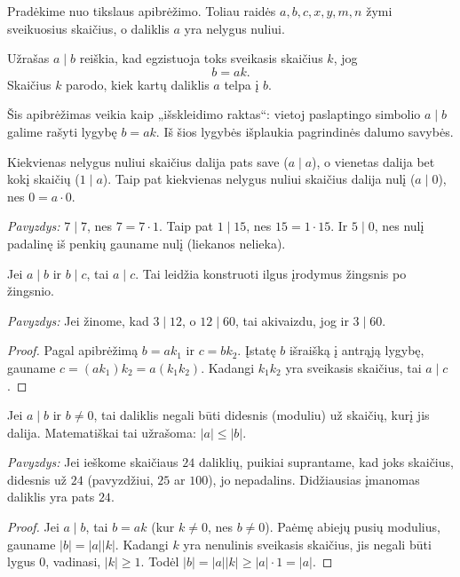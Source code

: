 \documentclass[11pt,a4paper]{scrartcl}
\begin{document}
Pradėkime nuo tikslaus apibrėžimo. Toliau raidės \(a,b,c,x,y,m,n\) žymi sveikuosius skaičius, o daliklis \(a\) yra nelygus nuliui.

\begin{definition*}
Užrašas \(a\mid b\) reiškia, kad egzistuoja toks sveikasis skaičius \(k\), jog
\begin{equation*}
    b=ak.
\end{equation*}
Skaičius \(k\) parodo, kiek kartų daliklis \(a\) telpa į \(b\).
\end{definition*}

Šis apibrėžimas veikia kaip „išskleidimo raktas“: vietoj paslaptingo simbolio \(a\mid b\) galime rašyti lygybę \(b=ak\). Iš šios lygybės išplaukia pagrindinės dalumo savybės.

\begin{proposition}
Kiekvienas nelygus nuliui skaičius dalija pats save (\(a \mid a\)), o vienetas dalija bet kokį skaičių (\(1 \mid a\)). Taip pat kiekvienas nelygus nuliui skaičius dalija nulį (\(a \mid 0\)), nes \(0 = a \cdot 0\).
\end{proposition}
\textit{Pavyzdys:} \(7 \mid 7\), nes \(7 = 7 \cdot 1\). Taip pat \(1 \mid 15\), nes \(15 = 1 \cdot 15\). Ir \(5 \mid 0\), nes nulį padalinę iš penkių gauname nulį (liekanos nelieka).

\begin{proposition}
Jei \(a \mid b\) ir \(b \mid c\), tai \(a \mid c\). Tai leidžia konstruoti ilgus įrodymus žingsnis po žingsnio.
\end{proposition}
\textit{Pavyzdys:} Jei žinome, kad \(3 \mid 12\), o \(12 \mid 60\), tai akivaizdu, jog ir \(3 \mid 60\).
\begin{proof}
Pagal apibrėžimą \(b = ak_1\) ir \(c = bk_2\). Įstatę \(b\) išraišką į antrąją lygybę, gauname \(c = (ak_1)k_2 = a(k_1k_2)\). Kadangi \(k_1k_2\) yra sveikasis skaičius, tai \(a \mid c\).
\end{proof}

\begin{proposition}
Jei \(a \mid b\) ir \(b \neq 0\), tai daliklis negali būti didesnis (moduliu) už skaičių, kurį jis dalija. Matematiškai tai užrašoma: \(|a| \le |b|\).
\end{proposition}
\textit{Pavyzdys:} Jei ieškome skaičiaus $24$ daliklių, puikiai suprantame, kad joks skaičius, didesnis už $24$ (pavyzdžiui, $25$ ar $100$), jo nepadalins. Didžiausias įmanomas daliklis yra pats $24$.
\begin{proof}
Jei \(a \mid b\), tai \(b = ak\) (kur \(k \neq 0\), nes \(b \neq 0\)). Paėmę abiejų pusių modulius, gauname \(|b| = |a||k|\). Kadangi \(k\) yra nenulinis sveikasis skaičius, jis negali būti lygus 0, vadinasi, \(|k| \ge 1\). Todėl \(|b| = |a||k| \ge |a| \cdot 1 = |a|\).
\end{proof}
\end{document}
